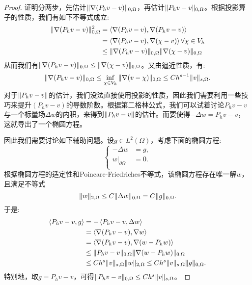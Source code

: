 \begin{proof}
    证明分两步，先估计$\|\nabla(P_{h}v-v)\|_{0,\Omega}$，再估计$\|P_{h}v-v\|_{0,\Omega}$。根据投影算子的性质，我们有如下不等式成立:
    \begin{equation}
        \label{eq:ineq_proj}
        \begin{aligned}
            \|\nabla(P_{h}v-v)\|_{0,\Omega}^{2}&=\left<\nabla(P_{h}v-v),\nabla(P_{h}v-v)\right>\\
            &=\left<\nabla(P_{h}v-v),\nabla(\chi-v)\right>\forall\chi\in V_{h}\\
            &\le\|\nabla(P_{h}v-v)\|_{0,\Omega}\|\nabla(\chi-v)\|_{0,\Omega}\\
        \end{aligned}
    \end{equation}
    从而我们有$\|\nabla(P_{h}v-v)\|_{0,\Omega}\le\|\nabla(\chi-v)\|_{0,\Omega}$。又由逼近性质，有:
    \begin{equation}
        \label{eq:estimate_2}
        \|\nabla(P_{h}v-v)\|_{0,\Omega}\le \inf_{\chi\in V_{h}}\|\nabla(v-\chi)\|_{0,\Omega}\le Ch^{s-1}\|v\|_{s,\Omega}.
    \end{equation}
    对于$\|P_{h}v-v\|$的估计，我们没法直接使用投影的性质，因此我们需要利用一些技巧来提升$(P_{h}v-v)$的导数阶数。根据第二格林公式，我们可以试着讨论$P_{h}v-v$与一个标量场$\Delta w$的内积，来得到$\|P_{h}v-v\|$的估计。而要使得$-\Delta w=P_{h}v-v$，这就导出了一个椭圆方程。

    因此我们需要讨论如下辅助问题。设$g\in L^{2}(\Omega)$，考虑下面的椭圆方程:
    \begin{equation}
        \label{eq:elliptic_aux}
        \left\{
            \begin{aligned}
                -\Delta w&=g,\\
                w|_{\partial\Omega}&=0.\\
            \end{aligned}
        \right.
    \end{equation}
    根据椭圆方程的适定性和Poincare-Friedriches不等式，该椭圆方程存在唯一解$w$，且满足不等式
    \begin{equation}
        \|w\|_{2,\Omega}\le C\|\Delta w\|_{0,\Omega}=C\|g\|_{0,\Omega}.
    \end{equation}
    于是:
    \begin{equation}
        \begin{aligned}
            \left<P_{h}v-v,g\right>&=-\left<P_{h}v-v,\Delta w\right>\\
            &=\left<\nabla(P_{h}v-v),\nabla w\right>\\
            &=\left<\nabla(P_{h}v-v),\nabla (w-P_{h}w)\right>\\
            &\le\|P_{h}v-v\|_{0,\Omega}\|\nabla(w-P_{h}w)\|_{0,\Omega}\\
            &\le Ch^{s}\|v\|_{s,\Omega}\|w\|_{2,\Omega}\le Ch^{s}\|v\|_{s,\Omega}\|g\|_{0,\Omega}.
        \end{aligned}
    \end{equation}
    特别地，取$g=P_{h}v-v$，可得$\|P_{h}v-v\|_{0,\Omega}\le Ch^{s}\|v\|_{s,\Omega}$。


\end{proof}
